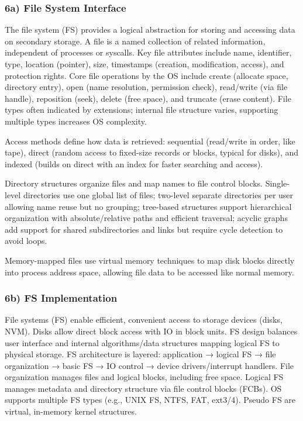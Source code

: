 \subsubsection*{6a) File System Interface}
The file system (FS) provides a logical abstraction for storing and accessing data on secondary storage. A file is a named collection of related information, independent of processes or syscalls. Key file attributes include name, identifier, type, location (pointer), size, timestamps (creation, modification, access), and protection rights. Core file operations by the OS include create (allocate space, directory entry), open (name resolution, permission check), read/write (via file handle), reposition (seek), delete (free space), and truncate (erase content). File types often indicated by extensions; internal file structure varies, supporting multiple types increases OS complexity.

Access methods define how data is retrieved: sequential (read/write in order, like tape), direct (random access to fixed-size records or blocks, typical for disks), and indexed (builds on direct with an index for faster searching and access).

Directory structures organize files and map names to file control blocks. Single-level directories use one global list of files; two-level separate directories per user allowing name reuse but no grouping; tree-based structures support hierarchical organization with absolute/relative paths and efficient traversal; acyclic graphs add support for shared subdirectories and links but require cycle detection to avoid loops.

Memory-mapped files use virtual memory techniques to map disk blocks directly into process address space, allowing file data to be accessed like normal memory.

\subsubsection*{6b) FS Implementation}
File systems (FS) enable efficient, convenient access to storage devices (disks, NVM). Disks allow direct block access with IO in block units. FS design balances user interface and internal algorithms/data structures mapping logical FS to physical storage. FS architecture is layered: application → logical FS → file organization → basic FS → IO control → device drivers/interrupt handlers. File organization manages files and logical blocks, including free space. Logical FS manages metadata and directory structure via file control blocks (FCBs). OS supports multiple FS types (e.g., UNIX FS, NTFS, FAT, ext3/4). Pseudo FS are virtual, in-memory kernel structures.

